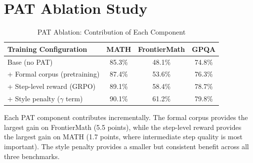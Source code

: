 \documentclass[11pt,a4paper]{article}
\begin{document}
\section{PAT Ablation Study}

\begin{table}[H]
\centering
\begin{tabular}{lccc}
\toprule
\textbf{Training Configuration} & \textbf{MATH} & \textbf{FrontierMath} & \textbf{GPQA} \\
\midrule
Base (no PAT)                   & 85.3\% & 48.1\% & 74.8\% \\
+ Formal corpus (pretraining)   & 87.4\% & 53.6\% & 76.3\% \\
+ Step-level reward (GRPO)      & 89.1\% & 58.4\% & 78.7\% \\
+ Style penalty ($\gamma$ term) & 90.1\% & 61.2\% & 79.8\% \\
\bottomrule
\end{tabular}
\caption{PAT Ablation: Contribution of Each Component}
\end{table}

Each PAT component contributes incrementally. The formal corpus provides the largest
gain on FrontierMath (5.5 points), while the step-level reward provides the largest
gain on MATH (1.7 points, where intermediate step quality is most important).
The style penalty provides a smaller but consistent benefit across all three benchmarks.
\end{document}
